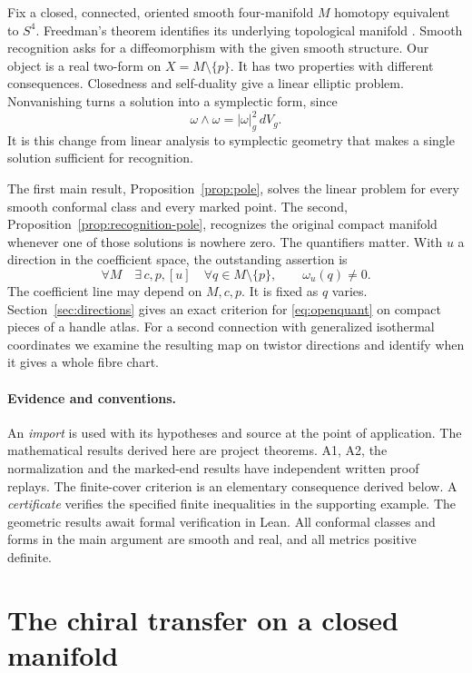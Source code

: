 \documentclass[11pt,letterpaper]{article}
\numberwithin{equation}{section}
\begin{document}
Fix a closed, connected, oriented smooth four-manifold \(M\) homotopy
equivalent to \(S^4\). Freedman's theorem identifies its underlying
topological manifold \cite[Theorem~1.6]{Freedman1982}. Smooth
recognition asks for a diffeomorphism with the given smooth structure.
Our object is a real two-form on \(X=M\setminus\{p\}\). It has two
properties with different consequences. Closedness and self-duality
give a linear elliptic problem. Nonvanishing turns a solution into a
symplectic form, since
\[
                    \omega\wedge\omega=|\omega|_g^2\,dV_g .
\]
It is this change from linear analysis to symplectic geometry that
makes a single solution sufficient for recognition.

The first main result, Proposition~\ref{prop:pole}, solves the linear
problem for every smooth conformal class and every marked point.
The second, Proposition~\ref{prop:recognition-pole}, recognizes the
original compact manifold whenever one of those solutions is nowhere
zero. The quantifiers matter. With \(u\) a direction in the coefficient
space, the outstanding assertion is
\begin{equation}\label{eq:openquant}
   \forall M\quad \exists\,c,p,[u]\quad
   \forall q\in M\setminus\{p\},\qquad \omega_u(q)\ne0 .
\end{equation}
The coefficient line may depend on \(M,c,p\). It is fixed as \(q\)
varies. Section~\ref{sec:directions} gives an exact criterion for
\eqref{eq:openquant} on compact pieces of a handle atlas. For a second
connection with generalized isothermal coordinates we examine the
resulting map on twistor directions and identify when it gives a
whole fibre chart.

\paragraph{Evidence and conventions.}
An \emph{import} is used with its hypotheses and source at the point
of application. The mathematical results derived here are project
theorems. A1, A2, the normalization and the marked-end results have
independent written proof replays. The finite-cover criterion is an
elementary consequence derived below. A \emph{certificate} verifies
the specified finite inequalities in the supporting example.
The geometric results await formal verification in Lean.
All conformal classes and forms in the main argument are smooth and
real, and all metrics positive definite.

\section{The chiral transfer on a closed manifold}
\label{sec:transfer}
\end{document}
